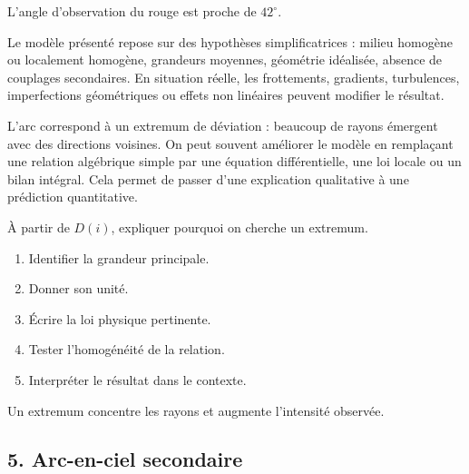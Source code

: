 \documentclass[11pt,a4paper]{article}
\begin{document}
\begin{odgbox}
L'angle d'observation du rouge est proche de $42^\circ$.
\end{odgbox}

\begin{attentionbox}
Le modèle présenté repose sur des hypothèses simplificatrices : milieu homogène ou localement homogène, grandeurs moyennes, géométrie idéalisée, absence de couplages secondaires. En situation réelle, les frottements, gradients, turbulences, imperfections géométriques ou effets non linéaires peuvent modifier le résultat.
\end{attentionbox}

\begin{approfondissementbox}
L'arc correspond à un extremum de déviation : beaucoup de rayons émergent avec des directions voisines.
On peut souvent améliorer le modèle en remplaçant une relation algébrique simple par une équation différentielle, une loi locale ou un bilan intégral. Cela permet de passer d'une explication qualitative à une prédiction quantitative.
\end{approfondissementbox}

\begin{exercicebox}
À partir de $D(i)$, expliquer pourquoi on cherche un extremum.
\begin{enumerate}
  \item Identifier la grandeur principale.
  \item Donner son unité.
  \item Écrire la loi physique pertinente.
  \item Tester l'homogénéité de la relation.
  \item Interpréter le résultat dans le contexte.
\end{enumerate}
\end{exercicebox}

\begin{corrigebox}[Indication]
Un extremum concentre les rayons et augmente l'intensité observée.
\end{corrigebox}


\subsection{5. Arc-en-ciel secondaire}
\end{document}
